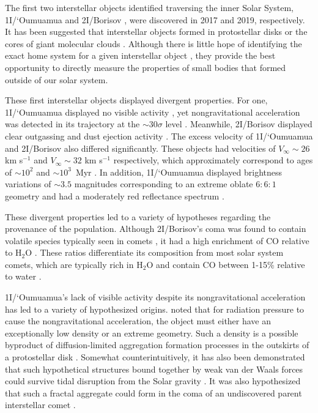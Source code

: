 \documentclass[twocolumn,longbib]{aastex7}
\begin{document}
\begin{CJK*}{UTF8}{gbsn}
The first two interstellar objects identified traversing the inner Solar System, 1I/`Oumuamua \citep{Williams17} and 2I/Borisov \citep{borisov_2I_cbet}, were discovered in 2017 and 2019, respectively. It has been suggested that interstellar objects formed in protostellar disks \citep{Fitzsimmons2024} or the cores of giant molecular clouds \citep{Hsieh2021}. Although there is little hope of identifying the exact home system for a given interstellar object \citep{Hallatt2020}, they provide the best opportunity to directly measure the properties of small bodies that formed outside of our solar system.


These first interstellar objects displayed divergent properties. For one, 1I/`Oumuamua displayed no visible activity \citep{Meech2017,Ye2017,Jewitt2017,Trilling2018}, yet nongravitational acceleration was detected in its trajectory at the $\sim30\sigma$ level \citep{Micheli2018}. Meanwhile, 2I/Borisov displayed clear outgassing and dust ejection activity \citep{Jewitt2019b,Fitzsimmons:2019,Bolin2019,Ye:2019,McKay2020,Guzik:2020,Hui2020,Kim2020,Cremonese2020,yang2021}. The excess velocity of 1I/`Oumuamua and 2I/Borisov also differed significantly. These objects had velocities of $V_\infty\sim26$ km s$^{-1}$ and $V_\infty\sim32$ km s$^{-1}$ respectively, which approximately correspond to ages of $\sim10^2$ and $\sim10^3$~Myr \citep{Mamajek2017,Gaidos2017a, Feng2018,Fernandes2018,Hallatt2020,Hsieh2021}. In addition, 1I/`Oumuamua displayed brightness variations of $\sim3.5$ magnitudes corresponding to an extreme oblate $6:6:1$ geometry \citep{Meech2017,Knight2017,Bolin2017,Fraser2017,Belton2018,Mashchenko2019,Taylor2023} and had a moderately red reflectance spectrum \citep{Meech2017,Fitzsimmons2017,Ye2017}.

These divergent properties led to a variety of hypotheses regarding the provenance of the population. Although 2I/Borisov's coma was found to contain volatile species typically seen in comets \citep{Opitom:2019-borisov, Kareta:2019, lin2020,Bannister2020,Xing2020,Bagnulo2021,Aravind2021}, it had a high enrichment of CO relative to H$_2$O \citep{Bodewits2020, Cordiner2020}. These ratios differentiate its composition from most solar system comets, which are typically rich in H$_2$O and contain CO between 1-15\% relative to water \citep{2024come.book..459B}.

1I/`Oumuamua's lack of visible activity despite its nongravitational acceleration has led to a variety of hypothesized origins. \citet{Micheli2018} noted that for radiation pressure to cause the nongravitational acceleration, the object must either have an exceptionally low density or an extreme geometry. Such a density is a possible byproduct of diffusion-limited aggregation formation processes in the outskirts of a protostellar disk \citep{MoroMartin2019}. Somewhat counterintuitively, it has also been demonstrated that such hypothetical structures bound together by weak van der Waals forces could survive tidal disruption from the Solar gravity \citep{Flekkoy19}. It was also hypothesized that such a fractal aggregate could form in the coma of an undiscovered parent interstellar comet \citep{Luu20}.


\end{CJK*}
\end{document}
